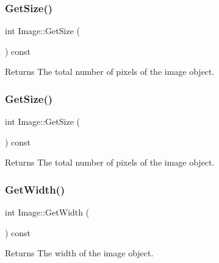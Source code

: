 \subsubsection{\texorpdfstring{Get\+Size()}{GetSize()}\hspace{0.1cm}{\footnotesize\ttfamily [1/2]}}
{\footnotesize\ttfamily int Image\+::\+Get\+Size (\begin{DoxyParamCaption}{ }\end{DoxyParamCaption}) const}

\begin{DoxyReturn}{Returns}
The total number of pixels of the image object. 
\end{DoxyReturn}
\mbox{\label{classImage_a8ee1acb5476bf0fecac66f5dfdd47a38}} 
\subsubsection{\texorpdfstring{Get\+Size()}{GetSize()}\hspace{0.1cm}{\footnotesize\ttfamily [2/2]}}
{\footnotesize\ttfamily int Image\+::\+Get\+Size (\begin{DoxyParamCaption}{ }\end{DoxyParamCaption}) const}

\begin{DoxyReturn}{Returns}
The total number of pixels of the image object. 
\end{DoxyReturn}
\mbox{\label{classImage_a3da5012d5e314ce03b53d77276232186}} 
\subsubsection{\texorpdfstring{Get\+Width()}{GetWidth()}\hspace{0.1cm}{\footnotesize\ttfamily [1/2]}}
{\footnotesize\ttfamily int Image\+::\+Get\+Width (\begin{DoxyParamCaption}{ }\end{DoxyParamCaption}) const}

\begin{DoxyReturn}{Returns}
The width of the image object. 
\end{DoxyReturn}
\mbox{\label{classImage_a3da5012d5e314ce03b53d77276232186}} 

